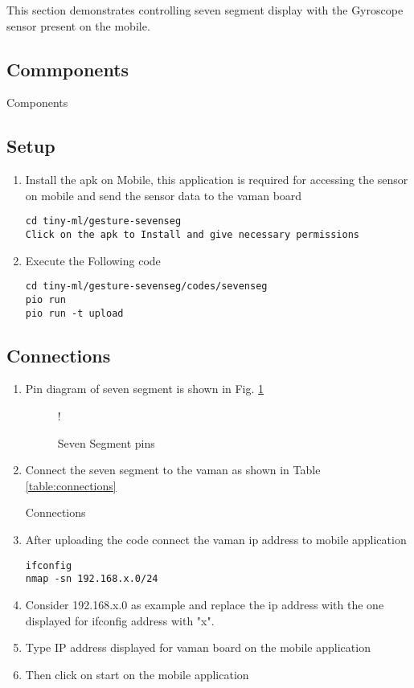 This section demonstrates controlling seven segment display with the Gyroscope sensor present on the mobile. 

\subsection{Commponents}
\begin{table}[!ht]
	    \centering
	    
	    \caption{Components}
	\end{table}
\subsection{Setup}
\begin{enumerate}
    \item Install the apk on Mobile, this application is required for accessing the sensor on mobile and send the sensor data to the vaman board
\begin{lstlisting}
cd tiny-ml/gesture-sevenseg
Click on the apk to Install and give necessary permissions
\end{lstlisting}
    \item Execute the Following code
\begin{lstlisting}
cd tiny-ml/gesture-sevenseg/codes/sevenseg
pio run
pio run -t upload
\end{lstlisting}
\end{enumerate}
\subsection{Connections}
\begin{enumerate}
    \item Pin diagram of seven segment is shown in Fig. \ref{fig:sevenseg}
    	\begin{figure}[!ht]
		\begin{center}
		\resizebox {0.5\columnwidth} {!} {}
		\end{center}
		\caption{Seven Segment pins}
		\label{fig:sevenseg}
	\end{figure}
    \item Connect the seven segment to the vaman as shown in Table \ref{table:connections}
    	\begin{table}[!ht]
	    \centering
	    
	    \caption{Connections}
	    \label{table:connections}
	\end{table}
    \item After uploading the code connect the vaman ip address to mobile application
\begin{lstlisting}
ifconfig
nmap -sn 192.168.x.0/24
\end{lstlisting}
    \item Consider 192.168.x.0 as example and replace the ip address with the one displayed for ifconfig address with "x".
    \item Type IP address displayed for vaman board on the mobile application
    \item Then click on start on the mobile application
\end{enumerate}
